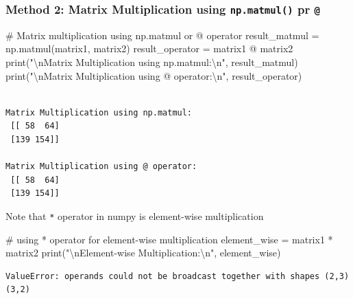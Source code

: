 \documentclass[
  letterpaper,
  DIV=11,
  numbers=noendperiod]{scrreprt}
\newenvironment{Shaded}{\begin{snugshade}}{\end{snugshade}}
\newcommand{\BuiltInTok}[1]{\textcolor[rgb]{0.00,0.23,0.31}{#1}}
\newcommand{\CharTok}[1]{\textcolor[rgb]{0.13,0.47,0.30}{#1}}
\newcommand{\CommentTok}[1]{\textcolor[rgb]{0.37,0.37,0.37}{#1}}
\newcommand{\NormalTok}[1]{\textcolor[rgb]{0.00,0.23,0.31}{#1}}
\newcommand{\OperatorTok}[1]{\textcolor[rgb]{0.37,0.37,0.37}{#1}}
\newcommand{\StringTok}[1]{\textcolor[rgb]{0.13,0.47,0.30}{#1}}
\begin{document}
\hypertarget{method-2-matrix-multiplication-using-np.matmul-pr}{%
\subsubsection{\texorpdfstring{Method 2: Matrix Multiplication using
\texttt{np.matmul()} pr
\texttt{@}}{Method 2: Matrix Multiplication using np.matmul() pr @}}\label{method-2-matrix-multiplication-using-np.matmul-pr}}

\begin{Shaded}
\begin{Highlighting}[]
\CommentTok{\# Matrix multiplication using np.matmul or @ operator}
\NormalTok{result\_matmul }\OperatorTok{=}\NormalTok{ np.matmul(matrix1, matrix2)}
\NormalTok{result\_operator }\OperatorTok{=}\NormalTok{ matrix1 }\OperatorTok{@}\NormalTok{ matrix2}
\BuiltInTok{print}\NormalTok{(}\StringTok{"}\CharTok{\textbackslash{}n}\StringTok{Matrix Multiplication using np.matmul:}\CharTok{\textbackslash{}n}\StringTok{"}\NormalTok{, result\_matmul)}
\BuiltInTok{print}\NormalTok{(}\StringTok{"}\CharTok{\textbackslash{}n}\StringTok{Matrix Multiplication using @ operator:}\CharTok{\textbackslash{}n}\StringTok{"}\NormalTok{, result\_operator)}
\end{Highlighting}
\end{Shaded}

\begin{verbatim}

Matrix Multiplication using np.matmul:
 [[ 58  64]
 [139 154]]

Matrix Multiplication using @ operator:
 [[ 58  64]
 [139 154]]
\end{verbatim}

Note that \texttt{*} operator in numpy is element-wise multiplication

\begin{Shaded}
\begin{Highlighting}[]
\CommentTok{\# using * operator for element{-}wise multiplication}
\NormalTok{element\_wise }\OperatorTok{=}\NormalTok{ matrix1 }\OperatorTok{*}\NormalTok{ matrix2}
\BuiltInTok{print}\NormalTok{(}\StringTok{"}\CharTok{\textbackslash{}n}\StringTok{Element{-}wise Multiplication:}\CharTok{\textbackslash{}n}\StringTok{"}\NormalTok{, element\_wise)}
\end{Highlighting}
\end{Shaded}

\begin{verbatim}
ValueError: operands could not be broadcast together with shapes (2,3) (3,2) 
\end{verbatim}
\end{document}
